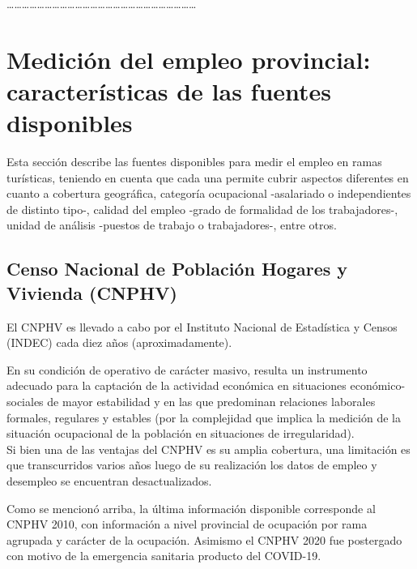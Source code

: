 \documentclass[
  openany]{book}
\begin{document}
\ldots\ldots\ldots\ldots\ldots\ldots\ldots\ldots\ldots\ldots\ldots\ldots\ldots\ldots\ldots\ldots\ldots\ldots\ldots\ldots\ldots\ldots\ldots\ldots\ldots{}

\hypertarget{mediciuxf3n-del-empleo-provincial-caracteruxedsticas-de-las-fuentes-disponibles}{%
\section{Medición del empleo provincial: características de las fuentes disponibles}\label{mediciuxf3n-del-empleo-provincial-caracteruxedsticas-de-las-fuentes-disponibles}}

Esta sección describe las fuentes disponibles para medir el empleo en ramas turísticas, teniendo en cuenta que cada una permite cubrir aspectos diferentes en cuanto a cobertura geográfica, categoría ocupacional -asalariado o independientes de distinto tipo-, calidad del empleo -grado de formalidad de los trabajadores-, unidad de análisis -puestos de trabajo o trabajadores-, entre otros.

\hypertarget{censo-nacional-de-poblaciuxf3n-hogares-y-vivienda-cnphv}{%
\subsection{Censo Nacional de Población Hogares y Vivienda (CNPHV)}\label{censo-nacional-de-poblaciuxf3n-hogares-y-vivienda-cnphv}}

El CNPHV es llevado a cabo por el Instituto Nacional de Estadística y Censos (INDEC) cada diez años (aproximadamente).

En su condición de operativo de carácter masivo, resulta un instrumento adecuado para la captación de la actividad económica en situaciones económico-sociales de mayor estabilidad y en las que predominan relaciones laborales formales, regulares y estables (por la complejidad que implica la medición de la situación ocupacional de la población en situaciones de irregularidad).\\

Si bien una de las ventajas del CNPHV es su amplia cobertura, una limitación es que transcurridos varios años luego de su realización los datos de empleo y desempleo se encuentran desactualizados.

Como se mencionó arriba, la última información disponible corresponde al CNPHV 2010, con información a nivel provincial de ocupación por rama agrupada y carácter de la ocupación.
Asimismo el CNPHV 2020 fue postergado con motivo de la emergencia sanitaria producto del COVID-19.
\end{document}
